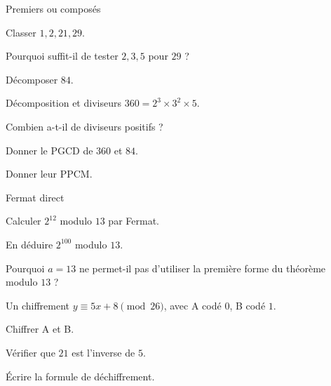 \exercices
{}
\begingroup\renewcommand{\otBesoinPlace}[1]{}\begin{minipage}{\linewidth}
\begin{exercice}[1]{Premiers ou composés}

\begin{questions}
\item Classer $1,2,21,29$.
\item Pourquoi suffit-il de tester $2,3,5$ pour $29$ ?
\item Décomposer $84$.
\end{questions}
\end{exercice}
\begin{exercice}[1]{Décomposition et diviseurs}
$360=2^3\times3^2\times5$.
\begin{questions}
\item Combien a-t-il de diviseurs positifs ?
\item Donner le PGCD de $360$ et $84$.
\item Donner leur PPCM.
\end{questions}
\end{exercice}
\begin{exercice}[1]{Fermat direct}

\begin{questions}
\item Calculer $2^{12}$ modulo $13$ par Fermat.
\item En déduire $2^{100}$ modulo $13$.
\item Pourquoi $a=13$ ne permet-il pas d’utiliser la première forme du théorème modulo $13$ ?
\end{questions}
\end{exercice}
\begin{exercice}[1]{Un chiffrement}
$y\equiv5x+8\pmod{26}$, avec A codé $0$, B codé $1$.
\begin{questions}
\item Chiffrer A et B.
\item Vérifier que $21$ est l’inverse de $5$.
\item Écrire la formule de déchiffrement.
\end{questions}
\end{exercice}
\end{minipage}\endgroup
\clearpage
{}
